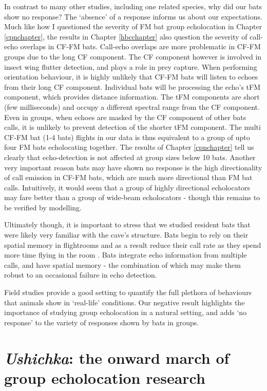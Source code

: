 \documentclass[
]{book}
\begin{document}
In contrast to many other studies, including one related species, why did our bats show no response? The `absence' of a response informs us about our expectations. Much like how I questioned the severity of FM bat group echolocation in Chapter \ref{cpnchapter}, the results in Chapter \ref{hbcchapter} also question the severity of call-echo overlaps in CF-FM bats. Call-echo overlaps are more problematic in CF-FM groups due to the long CF component. The CF component however is involved in insect wing flutter detection, and plays a role in prey capture. When performing orientation behaviour, it is highly unlikely that CF-FM bats will listen to echoes from their long CF component. Individual bats will be processing the echo's tFM component, which provides distance information. The tFM components are short (few milliseconds) and occupy a different spectral range from the CF component. Even in groups, when echoes are masked by the CF component of other bats calls, it is unlikely to prevent detection of the shorter tFM component. The multi CF-FM bat (1-4 bats) flights in our data is thus equivalent to a group of upto four FM bats echolocating together. The results of Chapter \ref{cpnchapter} tell us clearly that echo-detection is not affected at group sizes below 10 bats. Another very important reason bats may have shown no response is the high directionality of call emission in CF-FM bats, which are much more directional than FM bat calls. Intuitively, it would seem that a group of highly directional echolocators may fare better than a group of wide-beam echolocators - though this remains to be verified by modelling.

Ultimately though, it is important to stress that we studied resident bats that were likely very familiar with the cave's structure. Bats begin to rely on their spatial memory in flightrooms and as a result reduce their call rate as they spend more time flying in the room \citep{chen2015variation, yamada2020modulation, barchi2013spatial}. Bats integrate echo information from multiple calls, and have spatial memory - the combination of which may make them robust to an occasional failure in echo detection.

Field studies provide a good setting to quantify the full plethora of behaviours that animals show in `real-life' conditions. Our negative result highlights the importance of studying group echolocation in a natural setting, and adds `no response' to the variety of responses shown by bats in groups.

\hypertarget{ushichka-the-onward-march-of-group-echolocation-research}{%
\section{\texorpdfstring{\emph{Ushichka}: the onward march of group echolocation research}{Ushichka: the onward march of group echolocation research}}\label{ushichka-the-onward-march-of-group-echolocation-research}}
\end{document}
